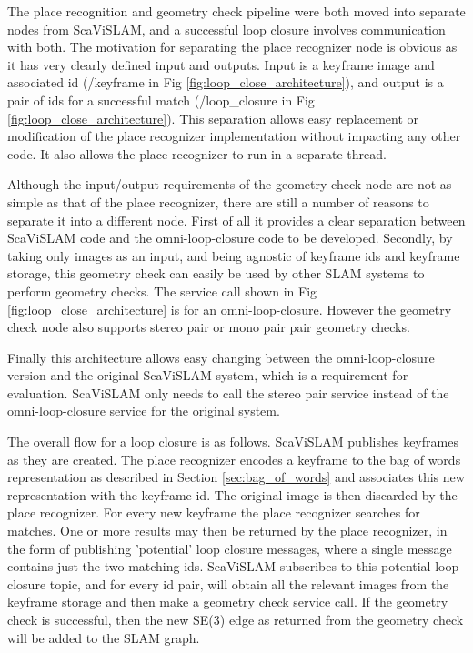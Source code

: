 The place recognition and geometry check pipeline were both moved into separate nodes from ScaViSLAM, and a successful loop closure involves communication with both.  The motivation for separating the place recognizer node is obvious as it has very clearly defined input and outputs.  Input is a keyframe image and associated id (/keyframe in Fig \ref{fig:loop_close_architecture}), and output is a pair of ids for a successful match (/loop\_closure in Fig \ref{fig:loop_close_architecture}).  This separation allows easy replacement or modification of the place recognizer implementation without impacting any other code.  It also allows the place recognizer to run in a separate thread.

Although the input/output requirements of the geometry check node are not as simple as that of the place recognizer, there are still a number of reasons to separate it into a different node.  First of all it provides a clear separation between ScaViSLAM code and the omni-loop-closure code to be developed.  Secondly, by taking only images as an input, and being agnostic of keyframe ids and keyframe storage, this geometry check can easily be used by other SLAM systems to perform geometry checks.  The service call shown in Fig \ref{fig:loop_close_architecture} is for an omni-loop-closure.  However the geometry check node also supports stereo pair or mono pair pair geometry checks.  

Finally this architecture allows easy changing between the omni-loop-closure version and the original ScaViSLAM system, which is a requirement for evaluation.  ScaViSLAM only needs to call the stereo pair service instead of the omni-loop-closure service for the original system.

The overall flow for a loop closure is as follows.  ScaViSLAM publishes keyframes as they are created.  The place recognizer encodes a keyframe to the bag of words representation as described in Section \ref{sec:bag_of_words} and associates this new representation with the keyframe id.  The original image is then discarded by the place recognizer.  For every new keyframe the place recognizer searches for matches.  One or more results may then be returned by the place recognizer, in the form of publishing 'potential' loop closure messages, where a single message contains just the two matching ids.  ScaViSLAM subscribes to this potential loop closure topic, and for every id pair, will obtain all the relevant images from the keyframe storage and then make a geometry check service call.  If the geometry check is successful, then the new SE(3) edge as returned from the geometry check will be added to the SLAM graph.

